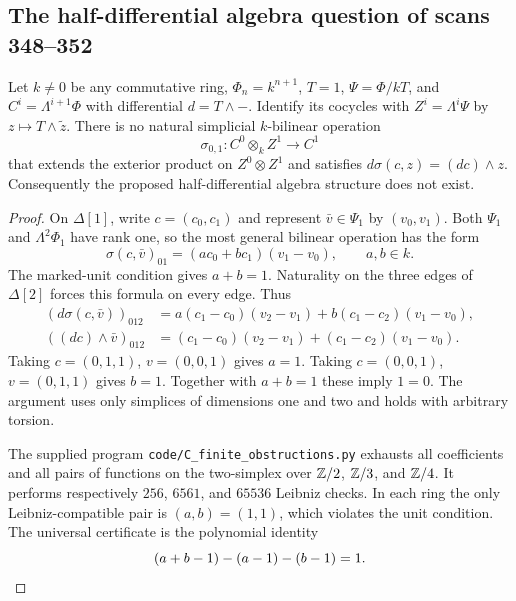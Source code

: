 \subsection{The half-differential algebra question of scans 348--352}

\begin{theorem}\label{sa08:B601}
Let $k\ne0$ be any commutative ring, $\Phi_n=k^{n+1}$, $T=1$,
$\Psi=\Phi/kT$, and $C^i=\Lambda^{i+1}\Phi$ with differential
$d=T\wedge-$. Identify its cocycles with $Z^i=\Lambda^i\Psi$ by
$z\mapsto T\wedge\widetilde z$. There is no natural simplicial
$k$-bilinear operation
\[
 \sigma_{0,1}:C^0\otimes_k Z^1\longrightarrow C^1
\]
that extends the exterior product on $Z^0\otimes Z^1$ and satisfies
$d\sigma(c,z)=(dc)\wedge z$. Consequently the proposed
half-differential algebra structure does not exist.
\end{theorem}
\begin{proof}
On $\Delta[1]$, write $c=(c_0,c_1)$ and represent $\bar v\in\Psi_1$
by $(v_0,v_1)$. Both $\Psi_1$ and $\Lambda^2\Phi_1$ have rank one,
so the most general bilinear operation has the form
\[
 \sigma(c,\bar v)_{01}=(a c_0+b c_1)(v_1-v_0),\qquad a,b\in k.
\]
The marked-unit condition gives $a+b=1$. Naturality on the three
edges of $\Delta[2]$ forces this formula on every edge. Thus
\begin{align*}
 (d\sigma(c,\bar v))_{012}
 &=a(c_1-c_0)(v_2-v_1)+b(c_1-c_2)(v_1-v_0),\\
 ((dc)\wedge\bar v)_{012}
 &=(c_1-c_0)(v_2-v_1)+(c_1-c_2)(v_1-v_0).
\end{align*}
Taking $c=(0,1,1)$, $v=(0,0,1)$ gives $a=1$.
Taking $c=(0,0,1)$, $v=(0,1,1)$ gives $b=1$.
Together with $a+b=1$ these imply $1=0$. The argument uses only
simplices of dimensions one and two and holds with arbitrary torsion.

The supplied program \texttt{code/C\_finite\_obstructions.py}
exhausts all coefficients and all pairs of functions on the
two-simplex over $\mathbb Z/2$, $\mathbb Z/3$, and $\mathbb Z/4$. It performs respectively
$256$, $6561$, and $65536$ Leibniz checks. In each ring the only
Leibniz-compatible pair is $(a,b)=(1,1)$, which violates the unit
condition. The universal certificate is the polynomial identity
\[
 (a+b-1)-(a-1)-(b-1)=1.\qedhere
\]
\end{proof}


